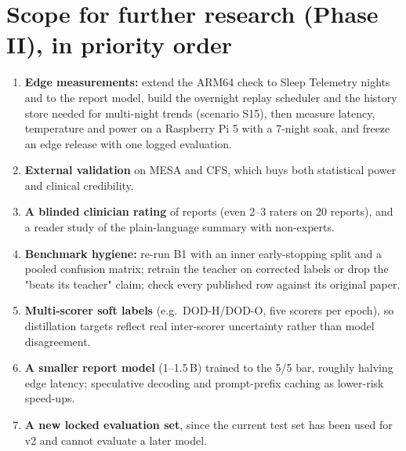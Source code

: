 \section*{Scope for further research (Phase II), in priority order}

\begin{enumerate}
  \item \textbf{Edge measurements:} extend the ARM64 check to Sleep Telemetry nights and to the report model, build the
  overnight replay scheduler and the history store needed for multi-night trends (scenario S15), then measure latency,
  temperature and power on a Raspberry Pi 5 with a 7-night soak, and freeze an edge release with one logged
  evaluation.
  \item \textbf{External validation} on MESA and CFS, which buys both statistical power and clinical credibility.
  \item \textbf{A blinded clinician rating} of reports (even 2--3 raters on 20 reports), and a reader study of the
  plain-language summary with non-experts.
  \item \textbf{Benchmark hygiene:} re-run B1 with an inner early-stopping split and a pooled confusion matrix;
  retrain the teacher on corrected labels or drop the "beats its teacher" claim; check every published row against
  its original paper.
  \item \textbf{Multi-scorer soft labels} (e.g.\ DOD-H/DOD-O, five scorers per epoch), so distillation targets
  reflect real inter-scorer uncertainty rather than model disagreement.
  \item \textbf{A smaller report model} (1--1.5\,B) trained to the 5/5 bar, roughly halving edge latency;
  speculative decoding and prompt-prefix caching as lower-risk speed-ups.
  \item \textbf{A new locked evaluation set}, since the current test set has been used for v2 and cannot evaluate
  a later model.
\end{enumerate}
